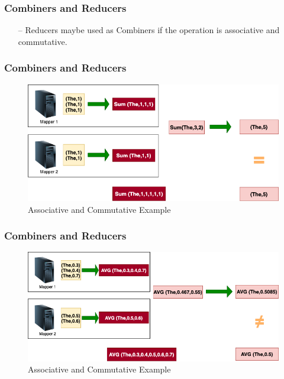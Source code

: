 \begin{frame}[c]{ }
	\frametitle{Combiners and Reducers }
	\begin{itemize}  [<+->]		
		\item [--] Reducers maybe used as Combiners if the operation is associative and commutative.	
	\end{itemize}


\end{frame}
\begin{frame}[c]{ }
	\frametitle{Combiners and Reducers }
	
\begin{figure}
	\includegraphics[height=.7\textheight]{./Figures/chapter-02/Combiners.png}
	\caption{Associative and Commutative Example }
\end{figure}		
\end{frame}
\begin{frame}[c]{ }
	\frametitle{Combiners and Reducers }
	
	\begin{figure}
		\includegraphics[height=.7\textheight]{./Figures/chapter-02/Combiners_AVG.png}
		\caption{Associative and Commutative Example }
	\end{figure}		
\end{frame}

